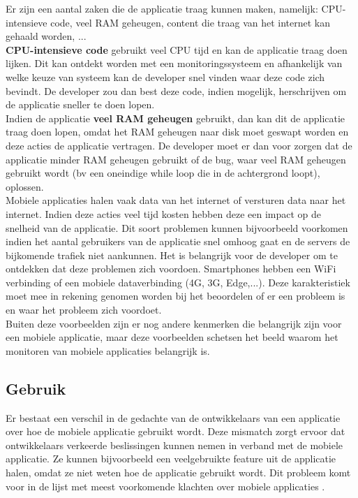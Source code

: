 Er zijn een aantal zaken die de applicatie traag kunnen maken, namelijk: CPU-intensieve code, veel RAM geheugen, content die traag van het internet kan gehaald worden, ... \\

\textbf{CPU-intensieve code} gebruikt veel CPU tijd en kan de applicatie traag doen lijken. Dit kan ontdekt worden met een monitoringssysteem en afhankelijk van welke keuze van systeem kan de developer snel vinden waar deze code zich bevindt. De developer zou dan best deze code, indien mogelijk, herschrijven om de applicatie sneller te doen lopen. \\

Indien de applicatie \textbf{veel RAM geheugen} gebruikt, dan kan dit de applicatie traag doen lopen, omdat het RAM geheugen naar disk moet geswapt worden en deze acties de applicatie vertragen. De developer moet er dan voor zorgen dat de applicatie minder RAM geheugen gebruikt of de bug, waar veel RAM geheugen gebruikt wordt (bv een oneindige while loop die in de achtergrond loopt), oplossen. \\

Mobiele applicaties halen vaak data van het internet of versturen data naar het internet. Indien deze acties veel tijd kosten hebben deze een impact op de snelheid van de applicatie. Dit soort problemen kunnen bijvoorbeeld voorkomen indien het aantal gebruikers van de applicatie snel omhoog gaat en de servers de bijkomende trafiek niet aankunnen. Het is belangrijk voor de developer om te ontdekken dat deze problemen zich voordoen. Smartphones hebben een WiFi verbinding of een mobiele dataverbinding (4G, 3G, Edge,...). Deze karakteristiek moet mee in rekening genomen worden bij het beoordelen of er een probleem is en waar het probleem zich voordoet.\\


Buiten deze voorbeelden zijn er nog andere kenmerken die belangrijk zijn voor een mobiele applicatie, maar deze voorbeelden schetsen het beeld waarom het monitoren van mobiele applicaties belangrijk is.

\subsection{Gebruik}
Er bestaat een verschil in de gedachte van de ontwikkelaars van een applicatie over hoe de mobiele applicatie gebruikt wordt. Deze mismatch zorgt ervoor dat ontwikkelaars verkeerde beslissingen kunnen nemen in verband met de mobiele applicatie. Ze kunnen bijvoorbeeld een veelgebruikte feature uit de applicatie halen, omdat ze niet weten hoe de applicatie gebruikt wordt. Dit probleem komt voor in de lijst met meest voorkomende klachten over mobiele applicaties \cite{AppSucks}. \\

